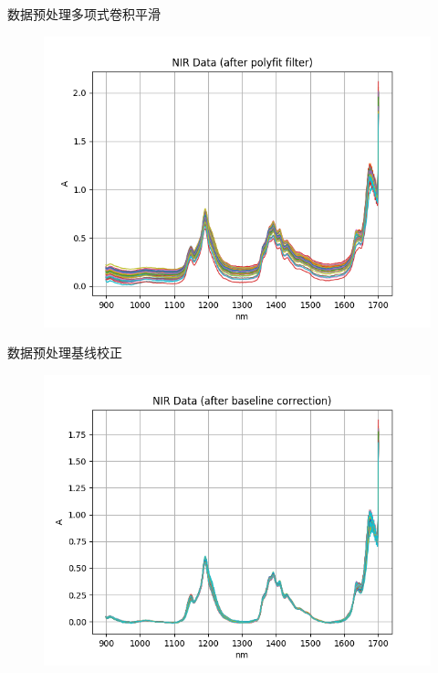 \documentclass[11pt]{beamer}
\begin{document}
	\begin{frame}{数据预处理}{多项式卷积平滑}
		\begin{figure}
			\centering
			\includegraphics[height=0.7\textheight]{../img/filter}
		\end{figure}
	\end{frame}
			
	\begin{frame}{数据预处理}{基线校正}
		\begin{figure}[h]
			\centering
			\includegraphics[height=0.7\textheight]{../img/baseline}
		\end{figure}
	\end{frame}
			
\end{document}
